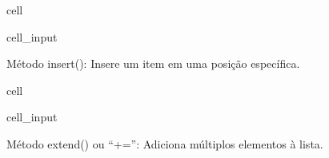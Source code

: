\documentclass[letterpaper,10pt,english]{jupyterBook}
\begin{document}
\begin{sphinxuseclass}{cell}\begin{sphinxVerbatimInput}

\begin{sphinxuseclass}{cell_input}
\begin{sphinxVerbatim}[commandchars=\\\{\}]
  \PYG{p}{[}  \PYG{p}{]}
  
\end{sphinxVerbatim}

\end{sphinxuseclass}\end{sphinxVerbatimInput}

\end{sphinxuseclass}
\sphinxAtStartPar
Método insert(): Insere um item em uma posição específica.

\begin{sphinxuseclass}{cell}\begin{sphinxVerbatimInput}

\begin{sphinxuseclass}{cell_input}
\begin{sphinxVerbatim}[commandchars=\\\{\}]
 
\end{sphinxVerbatim}

\end{sphinxuseclass}\end{sphinxVerbatimInput}

\end{sphinxuseclass}
\sphinxAtStartPar
Método extend() ou “+=”: Adiciona múltiplos elementos à lista.
\end{document}

